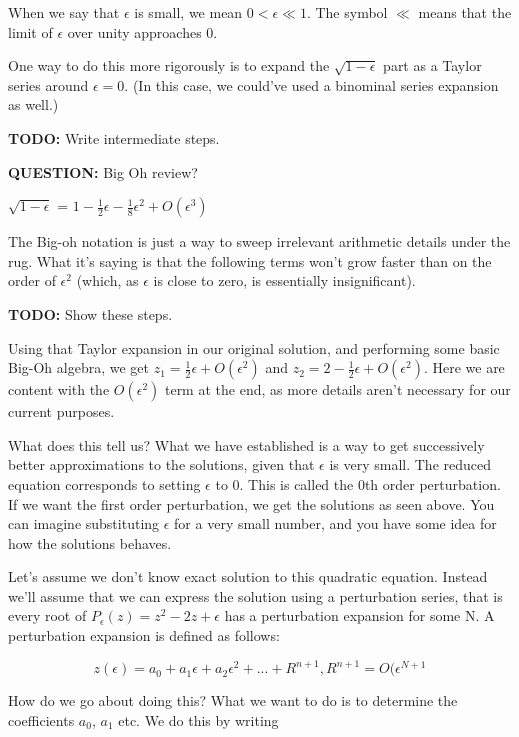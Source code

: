 \documentclass[12pt]{report}
\begin{document}
When we say that $\epsilon$ is small, we mean $0 < \epsilon
\ll 1$. The symbol $\ll$ means that the limit of $\epsilon$ over unity
approaches $0$.

One way to do this more rigorously is to expand the $\sqrt{1-\epsilon}$
part as a Taylor series around $\epsilon = 0$. (In this case, we
could've used a binominal series expansion as well.)

\textbf{TODO:} Write intermediate steps.

\textbf{QUESTION:} Big Oh review?

$\sqrt{1 - \epsilon}$ = $1 - \frac 1 2 \epsilon - \frac 1 8 \epsilon^2
+ O(\epsilon^3)$

The Big-oh notation is just a way to sweep irrelevant arithmetic
details under the rug. What it's saying is that the following terms
won't grow faster than on the order of $\epsilon^2$
(which, as $\epsilon$ is close to zero, is essentially insignificant).

\textbf{TODO:} Show these steps.

Using that Taylor expansion in our original solution, and performing some basic
Big-Oh algebra, we get $z_1 = \frac 1 2 \epsilon + O(\epsilon^2)$ and $z_2 = 2 -
\frac 1 2 \epsilon + O(\epsilon^2)$. Here we are content with the $O(\epsilon^2)$
term at the end, as more details aren't necessary for our current purposes.

What does this tell us? What we have established is a way to get successively better
approximations to the solutions, given that $\epsilon$ is very small. The
reduced equation corresponds to setting $\epsilon$ to $0$. This is called the 0th order perturbation.
If we want the first order perturbation, we get the solutions as seen above. You can imagine
substituting $\epsilon$ for a very small number, and you have some idea for how
the solutions behaves.

Let's assume we don't know exact solution to this quadratic equation. Instead
we'll assume that we can express the solution using a perturbation series, that
is every root of $P_\epsilon(z) = z^2 - 2z + \epsilon$ has a perturbation
expansion for some N. A perturbation expansion is defined as follows:

\begin{equation}
  z(\epsilon) = a_0 + a_1 \epsilon + a_2 \epsilon^2 + ...  + R^{n+1}, R^{n+1} = O(\epsilon^{N+1}
\end{equation}

How do we go about doing this? What we want to do is to determine the
coefficients $a_0$, $a_1$ etc. We do this by writing
\end{document}
